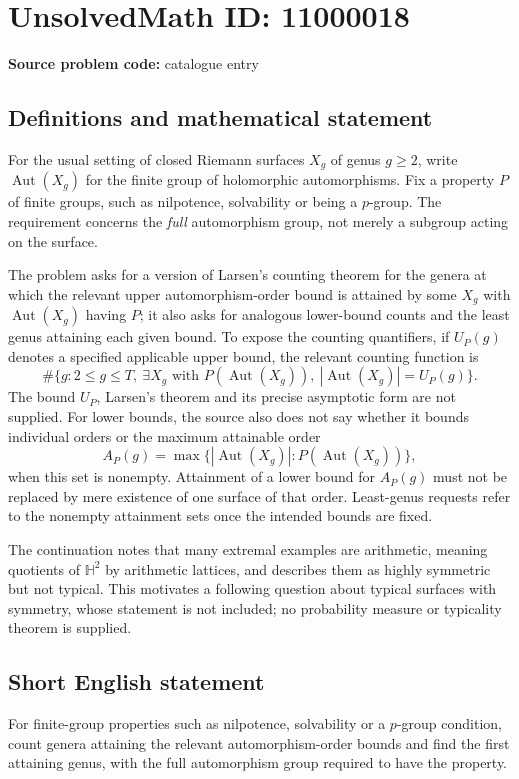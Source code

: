 \documentclass[11pt]{article}
\begin{document}
\section*{UnsolvedMath ID: 11000018}
\textbf{Source problem code:} catalogue entry
\subsection{Definitions and mathematical statement}
For the usual setting of closed Riemann surfaces \(X_g\) of genus \(g\geq2\), write \(\operatorname{Aut}(X_g)\) for the finite group of holomorphic automorphisms. Fix a property \(P\) of finite groups, such as nilpotence, solvability or being a \(p\)-group. The requirement concerns the \emph{full} automorphism group, not merely a subgroup acting on the surface.

The problem asks for a version of Larsen's counting theorem for the genera at which the relevant upper automorphism-order bound is attained by some \(X_g\) with \(\operatorname{Aut}(X_g)\) having \(P\); it also asks for analogous lower-bound counts and the least genus attaining each given bound. To expose the counting quantifiers, if \(U_P(g)\) denotes a specified applicable upper bound, the relevant counting function is
\[
 \#\{g:2\leq g\leq T,\ \exists X_g\text{ with }
 P(\operatorname{Aut}(X_g)),\ |\operatorname{Aut}(X_g)|=U_P(g)\}.
\]
The bound \(U_P\), Larsen's theorem and its precise asymptotic form are not supplied. For lower bounds, the source also does not say whether it bounds individual orders or the maximum attainable order
\[
 A_P(g)=\max\{|\operatorname{Aut}(X_g)|:P(\operatorname{Aut}(X_g))\},
\]
when this set is nonempty. Attainment of a lower bound for \(A_P(g)\) must not be replaced by mere existence of one surface of that order. Least-genus requests refer to the nonempty attainment sets once the intended bounds are fixed.

The continuation notes that many extremal examples are arithmetic, meaning quotients of \(\mathbb H^2\) by arithmetic lattices, and describes them as highly symmetric but not typical. This motivates a following question about typical surfaces with symmetry, whose statement is not included; no probability measure or typicality theorem is supplied.
\subsection{Short English statement}
For finite-group properties such as nilpotence, solvability or a \(p\)-group condition, count genera attaining the relevant automorphism-order bounds and find the first attaining genus, with the full automorphism group required to have the property.
\end{document}
